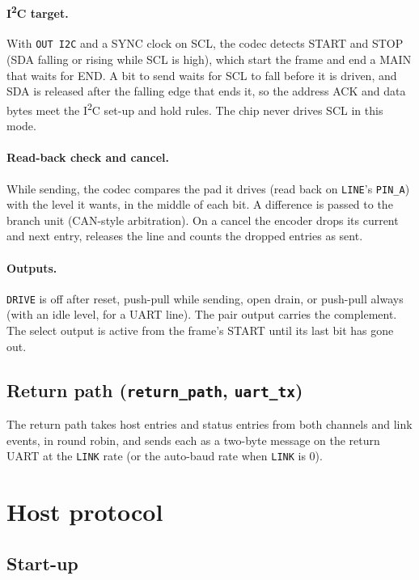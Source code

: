 \documentclass[11pt,a4paper]{article}
\newcommand{\sig}[1]{\texttt{#1}}
\begin{document}
\paragraph{I\textsuperscript{2}C target.} With \sig{OUT I2C} and a SYNC clock on SCL, the codec detects START and STOP (SDA falling or rising while SCL is high), which start the frame and end a MAIN that waits for END. A bit to send waits for SCL to fall before it is driven, and SDA is released after the falling edge that ends it, so the address ACK and data bytes meet the I\textsuperscript{2}C set-up and hold rules. The chip never drives SCL in this mode.

\paragraph{Read-back check and cancel.} While sending, the codec compares the pad it drives (read back on \sig{LINE}'s \sig{PIN\_A}) with the level it wants, in the middle of each bit. A difference is passed to the branch unit (CAN-style arbitration). On a cancel the encoder drops its current and next entry, releases the line and counts the dropped entries as sent.

\paragraph{Outputs.} \sig{DRIVE} is off after reset, push-pull while sending, open drain, or push-pull always (with an idle level, for a UART line). The pair output carries the complement. The select output is active from the frame's START until its last bit has gone out.

\subsection{Return path (\sig{return\_path}, \sig{uart\_tx})}

The return path takes host entries and status entries from both channels and link events, in round robin, and sends each as a two-byte message on the return UART at the \sig{LINK} rate (or the auto-baud rate when \sig{LINK} is 0).

\section{Host protocol}

\subsection{Start-up}
\end{document}
